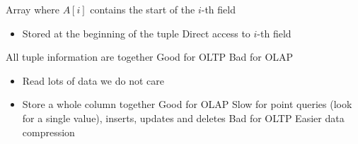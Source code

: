\begin{itemize}
\begin{itemize}
\begin{itemize}
\begin{itemize}
\begin{itemize}
                                \end{itemize}
                             Array where $A[i]$ contains the start of the $i$-th field
                                \begin{itemize}
                                    \item Stored at the beginning of the tuple
                                    \ipro Direct access to $i$-th field
                                \end{itemize}
                        \end{itemize}
                \end{itemize}
            \ipro All tuple information are together
            \ipro Good for OLTP
            \icon Bad for OLAP
                \begin{itemize}
                    \item Read lots of data we do not care
                \end{itemize}
        \end{itemize}
        \begin{itemize}
            \item Store a whole column together
            \ipro Good for OLAP
            \icon Slow for point queries (look for a single value), inserts, updates and deletes
            \icon Bad for OLTP
            \ipro Easier data compression
        \end{itemize}
\end{itemize}
